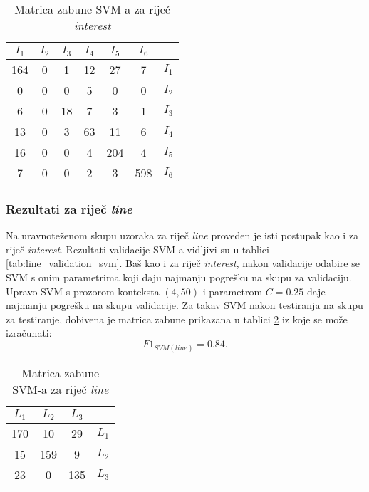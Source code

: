 \documentclass[10pt, a4paper]{article}
\begin{document}
\begin{table}[!hbtp]
\caption{Matrica zabune SVM-a za riječ \emph{interest}}
\label{tab:interest_confusion_svm}
\begin{center}
\begin{tabular}{|cccccc|c|}
\hline
$I_1$ & $I_2$ & $I_3$ & $I_4$ & $I_5$ & $I_6$ &  \\
\hline
 164 & 0 &  1 & 12 & 27 &  7 & $I_1$  \\
   0 & 0 &  0 &  5 &  0 &  0 & $I_2$  \\
   6 & 0 & 18 &  7 &  3 &  1 & $I_3$  \\
  13 & 0 & 3  & 63 & 11 &  6 & $I_4$  \\
  16 & 0 & 0  & 4  &204 &  4 & $I_5$  \\
   7 & 0 & 0  & 2  &  3 & 598  &$I_6$  \\
\hline
\end{tabular}
\end{center}
\end{table}
\subsubsection{Rezultati za riječ \emph{line}} 
Na uravnoteženom skupu uzoraka za riječ \emph{line} proveden
je isti postupak kao i za riječ \emph{interest}. 
Rezultati validacije SVM-a vidljivi su u tablici \ref{tab:line_validation_svm}.
Baš kao i za riječ \emph{interest}, nakon validacije odabire se
SVM s onim parametrima koji daju najmanju pogrešku na skupu za validaciju.
Upravo SVM s prozorom konteksta $(4,50)$ i parametrom $C = 0.25$ daje 
najmanju pogrešku na skupu validacije.
Za takav SVM nakon testiranja na skupu za testiranje, dobivena
je matrica zabune prikazana u tablici \ref{tab:line_confusion_svm}
iz koje se može izračunati:
\begin{equation}
\label{eq:f1_svm_line}
F1_{SVM(line)} = 0.84.
\end{equation}

\begin{table}[!hbtp]
\caption{Matrica zabune SVM-a za riječ \emph{line}}
\label{tab:line_confusion_svm}
\begin{center}
\begin{tabular}{|ccc|c|}
\hline
$L_1$ & $L_2$ & $L_3$ &  \\
\hline
 170  & 10  & 29 & $L_1$ \\
  15  & 159  & 9 & $L_2$ \\
  23  & 0  & 135 & $L_3$ \\
\hline
\end{tabular}
\end{center}
\end{table}
\end{document}
